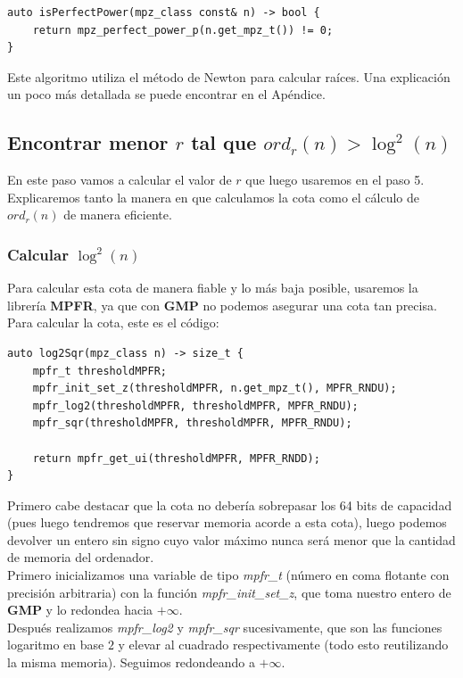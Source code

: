 \begin{lstlisting}
auto isPerfectPower(mpz_class const& n) -> bool {
	return mpz_perfect_power_p(n.get_mpz_t()) != 0;
}
\end{lstlisting}

Este algoritmo utiliza el método de Newton para calcular raíces. Una explicación un poco más detallada se puede encontrar en el Apéndice.

\subsection{Encontrar menor $r$ tal que $ord_r(n) > \log^2(n)$}

En este paso vamos a calcular el valor de $r$ que luego usaremos en el paso 5. Explicaremos tanto la manera en que calculamos la cota como el cálculo de $ord_r(n)$ de manera eficiente.

\subsubsection{Calcular $\log^2(n)$}

Para calcular esta cota de manera fiable y lo más baja posible, usaremos la librería \textbf{MPFR}, ya que con \textbf{GMP} no podemos asegurar una cota tan precisa. Para calcular la cota, este es el código:\\

\begin{lstlisting}
auto log2Sqr(mpz_class n) -> size_t {
	mpfr_t thresholdMPFR;
	mpfr_init_set_z(thresholdMPFR, n.get_mpz_t(), MPFR_RNDU);
	mpfr_log2(thresholdMPFR, thresholdMPFR, MPFR_RNDU);
	mpfr_sqr(thresholdMPFR, thresholdMPFR, MPFR_RNDU);
	
	return mpfr_get_ui(thresholdMPFR, MPFR_RNDD);
}
\end{lstlisting}

Primero cabe destacar que la cota no debería sobrepasar los 64 bits de capacidad (pues luego tendremos que reservar memoria acorde a esta cota), luego podemos devolver un entero sin signo cuyo valor máximo nunca será menor que la cantidad de memoria del ordenador.\\

Primero inicializamos una variable de tipo \textit{mpfr\_t} (número en coma flotante con precisión arbitraria) con la función \textit{mpfr\_init\_set\_z}, que toma nuestro entero de \textbf{GMP} y lo redondea hacia $+\infty$.\\

Después realizamos \textit{mpfr\_log2} y \textit{mpfr\_sqr} sucesivamente, que son las funciones logaritmo en base $2$ y elevar al cuadrado respectivamente (todo esto reutilizando la misma memoria). Seguimos redondeando a $+\infty$.\\

